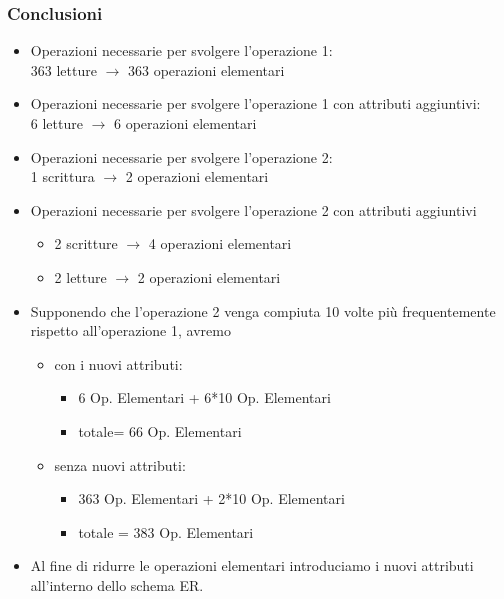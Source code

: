 \subsubsection{Conclusioni}
\begin{itemize}
	\item Operazioni necessarie per svolgere l’operazione 1:\\363 letture $\to$ 363 operazioni elementari 
	\item Operazioni necessarie per svolgere l’operazione 1 con attributi aggiuntivi:\\ 6 letture $\to$ 6 operazioni elementari 
	\item Operazioni necessarie per svolgere l’operazione 2:\\ 1 scrittura $\to$ 2 operazioni elementari 
	\item Operazioni necessarie per svolgere l’operazione 2 con attributi aggiuntivi
	\begin{itemize}
		\item 2 scritture $\to$ 4 operazioni elementari
		\item 2 letture $\to$ 2 operazioni elementari
	\end{itemize}
	\item Supponendo che l’operazione 2 venga compiuta 10 volte più frequentemente rispetto all’operazione 1, avremo
	\begin{itemize}
		\item con i nuovi attributi:
		\begin{itemize}
			\item  6 Op. Elementari + 6*10 Op. Elementari 
			\item totale= 66 Op. Elementari
		\end{itemize}
		\item senza nuovi attributi:
		\begin{itemize}
			\item 363 Op. Elementari + 2*10 Op. Elementari 
			\item totale = 383 Op. Elementari
		\end{itemize}
	\end{itemize}
	\item Al fine di ridurre le operazioni elementari introduciamo i nuovi attributi all’interno dello schema ER.
\end{itemize}

